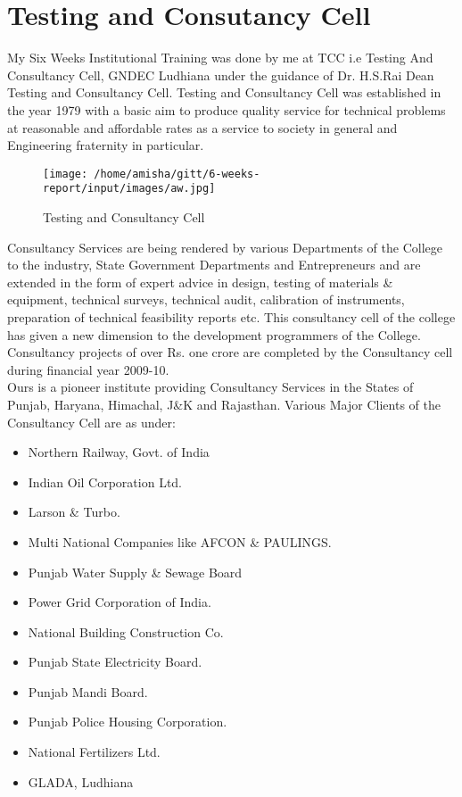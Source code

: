 \section{Testing and Consutancy Cell}

My Six Weeks Institutional Training was done by me at TCC i.e Testing And
Consultancy Cell,
GNDEC Ludhiana under the guidance of Dr. H.S.Rai Dean Testing and Consultancy Cell.
Testing and Consultancy Cell was established in the year 1979 with a basic aim to produce
quality service for technical problems at reasonable and affordable rates as a service to society
in general and Engineering fraternity in particular.\\
\begin{figure}[ht]
\centering
\texttt{[image: /home/amisha/gitt/6-weeks-report/input/images/aw.jpg]}
\caption{Testing and Consultancy Cell}
\end{figure}
\hspace{-1.7em} 

Consultancy Services are being rendered by various Departments of the College to the
industry, State Government Departments and Entrepreneurs and are extended in the form of
expert advice in design, testing of materials \& equipment, technical surveys, technical audit,
calibration of instruments, preparation of technical feasibility reports etc.
This consultancy cell of the college has given a new dimension to the development
programmers of the College. Consultancy projects of over Rs. one crore are completed by the
Consultancy cell during financial year 2009-10. \\
Ours is a pioneer institute providing Consultancy Services in the States of Punjab, Haryana,
Himachal, J\&K and Rajasthan. Various Major Clients of the Consultancy Cell are as under:

\begin{itemize}
\item Northern Railway, Govt. of India
\item Indian Oil Corporation Ltd.
\item Larson \& Turbo.
\item Multi National Companies like AFCON \& PAULINGS.
\item Punjab Water Supply \& Sewage Board
\item Power Grid Corporation of India.
\item National Building Construction Co.
\item Punjab State Electricity Board.
\item Punjab Mandi Board.
\item Punjab Police Housing Corporation.
\item National Fertilizers Ltd.
\item GLADA, Ludhiana
\end{itemize}


